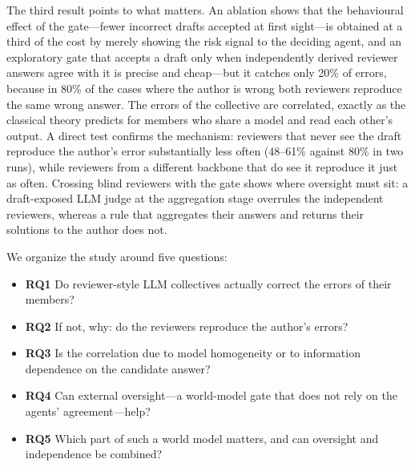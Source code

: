 \documentclass[manuscript, screen, review]{acmart}
\begin{document}
The third result points to what matters. An ablation shows that the behavioural effect of the gate---fewer incorrect drafts accepted at first sight---is obtained at a third of the cost by merely showing the risk signal to the deciding agent, and an exploratory gate that accepts a draft only when independently derived reviewer answers agree with it is precise and cheap---but it catches only 20\% of errors, because in 80\% of the cases where the author is wrong both reviewers reproduce the same wrong answer. The errors of the collective are correlated, exactly as the classical theory predicts for members who share a model and read each other's output. A direct test confirms the mechanism: reviewers that never see the draft reproduce the author's error substantially less often (48--61\% against 80\% in two runs), while reviewers from a different backbone that do see it reproduce it just as often. Crossing blind reviewers with the gate shows where oversight must sit: a draft-exposed LLM judge at the aggregation stage overrules the independent reviewers, whereas a rule that aggregates their answers and returns their solutions to the author does not.

We organize the study around five questions:
\begin{itemize}
    \item \textbf{RQ1} Do reviewer-style LLM collectives actually correct the errors of their members?
    \item \textbf{RQ2} If not, why: do the reviewers reproduce the author's errors?
    \item \textbf{RQ3} Is the correlation due to model homogeneity or to information dependence on the candidate answer?
    \item \textbf{RQ4} Can external oversight---a world-model gate that does not rely on the agents' agreement---help?
    \item \textbf{RQ5} Which part of such a world model matters, and can oversight and independence be combined?
\end{itemize}
\end{document}
